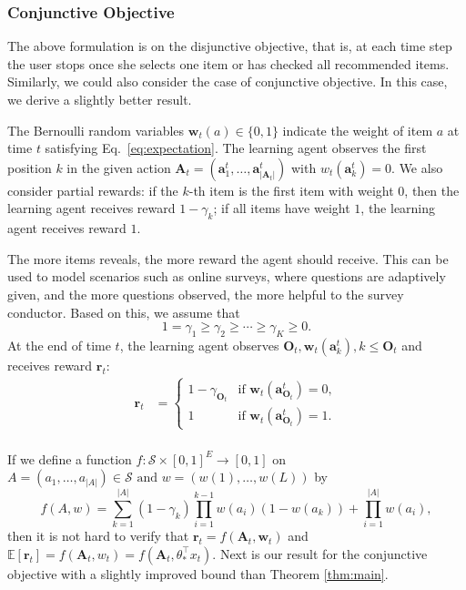 \documentclass{article}
\newcommand{\EE}{\mathbb{E}}
\newcommand{\bA}{\mathbf{A}}
\newcommand{\ba}{\mathbf{a}}
\newcommand{\bO}{\mathbf{O}}
\newcommand{\br}{\mathbf{r}}
\newcommand{\bw}{\mathbf{w}}
\newcommand{\cS}{\mathcal{S}}
\newcommand{\abs}[1]{\left| #1 \right|}
\begin{document}
\subsubsection{Conjunctive Objective}
\label{sec:conj}

The above formulation is on the disjunctive objective, that is, at each time step the user stops once she selects one item or has checked all recommended items. Similarly, we could also consider the case of conjunctive objective. In this case, we derive a slightly better result.

The Bernoulli random variables $\bw_{t}(a) \in \{0,1\}$ indicate the weight of item $a$ at time $t$ satisfying Eq.~\eqref{eq:expectation}. The learning agent observes the first position $k$ in the given action $\bA_t = (\ba_1^t, \ldots, \ba_{|\bA_t|}^t)$ with $w_t(\ba_k^t)=0$. We also consider partial rewards: if the $k$-th item is the first item with weight $0$, then the learning agent receives reward $1-\gamma_k$; if all items have weight $1$, the learning agent receives reward $1$. 

The more items reveals, the more reward the agent should receive. This can be used to model scenarios such as online surveys, where questions are adaptively given, and the more questions observed, the more helpful to the survey conductor. Based on this, we assume that
$$
1 = \gamma_1 \geq \gamma_2 \geq \cdots \geq \gamma_K \geq 0.
$$
At the end of time $t$, the learning agent observes $\bO_{t}, \bw_t(\ba_k^t), k \leq \bO_{t}$ and receives reward $\br_{t}$:
\begin{align*}
	\br_{t} &= \begin{cases}
		1 - \gamma_{\bO_{t}}  &\text{if } \bw_t(\ba_{\bO_{t}}^t) = 0,\\
		1 &\text{if } \bw_t(\ba_{\bO_{t}}^t) = 1.
	\end{cases}\\
\end{align*}

If we define a function $f : \cS \times [0,1]^E \to [0,1]$ on $A = (a_1, \ldots, a_{\abs{A}}) \in \cS \text{ and } w = (w(1), \ldots, w(L))$ by
\begin{equation}
	\label{eq:AndRewardFunc}
	f(A,w) = \sum_{k = 1}^{\abs{A}} (1 - \gamma_k) \prod_{i = 1}^{k - 1} w(a_i)(1 - w(a_k)) + \prod_{i=1}^{\abs{A}}w(a_i),
\end{equation}
then it is not hard to verify that $\br_{t} = f(\bA_t, \bw_t)$ and $\EE[\br_{t}] = f(\bA_t, w_t) = f(\bA_t, \theta_{\ast}^{\top}x_t)$. Next is our result for the conjunctive objective with a slightly improved bound than Theorem \ref{thm:main}.
\end{document}
